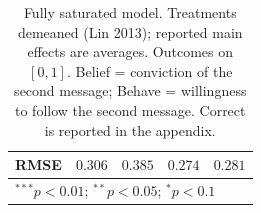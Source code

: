 \begin{table}
\begin{center}
\begin{tabular}{l c c || c c}
RMSE                                   & $0.306$        & $0.385$        & $0.274$        & $0.281$        \\
\hline
\multicolumn{5}{l}{\scriptsize{$^{***}p<0.01$; $^{**}p<0.05$; $^{*}p<0.1$}}
\end{tabular}
\caption{Fully saturated model. Treatments demeaned (Lin 2013); reported main effects are averages. Outcomes on $[0,1]$. Belief = conviction of the second message; Behave = willingness to follow the second message. Correct is reported in the appendix.}
\label{table:saturated}
\end{center}
\end{table}


